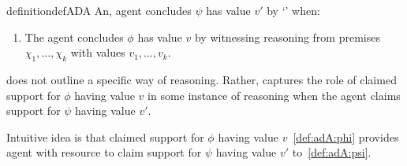 

\begin{note}
  \begin{restatable}[\adA{}]{definition}{defADA}\label{AR:adA}\label{def:adA}
    An, agent concludes \(\psi\) has value \(v'\) by `\adA{}' when:
    \begin{enumerate}[label=\textsf{S:\arabic*}., ref=(\textsf{S}:\arabic*)]%
    \item\label{def:adA:psi} The agent concludes \(\phi\) has value \(v\) by witnessing reasoning from premises \(\chi_{1},\dots,\chi_{k}\) with values \(v_{1},\dots,v_{k}\).
    \end{enumerate}
    \vspace{-\baselineskip}
  \end{restatable}
\end{note}

\begin{note}
  \adA{} does not outline a specific way of reasoning.
  Rather, captures the role of claimed support for \(\phi\) having value \(v\) in some instance of reasoning when the agent claims support for \(\psi\) having value \(v'\).

  Intuitive idea is that claimed support for \(\phi\) having value \(v\)~\ref{def:adA:phi} provides agent with resource to claim support for \(\psi\) having value \(v'\) to~\ref{def:adA:psi}.
\end{note}

